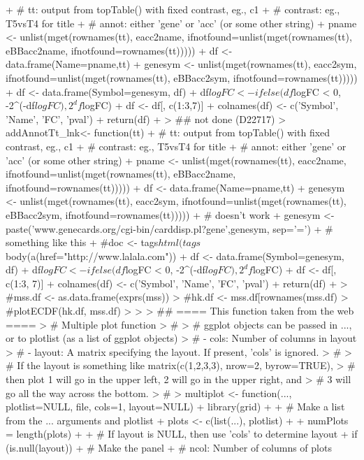 \documentclass[a4paper]{article}
\begin{document}
\begin{Schunk}
\begin{Sinput}
{+     # tt: output from topTable() with fixed contrast, eg., c1
+     # contrast: eg., T5vsT4 for title
+     # annot: either 'gene' or 'acc' (or some other string)
+     pname <- unlist(mget(rownames(tt), eacc2name, ifnotfound=unlist(mget(rownames(tt), eBBacc2name, ifnotfound=rownames(tt)))))
+     df <- data.frame(Name=pname,tt)
+     genesym <- unlist(mget(rownames(tt), eacc2sym, ifnotfound=unlist(mget(rownames(tt), eBBacc2sym, ifnotfound=rownames(tt)))))
+     df <- data.frame(Symbol=genesym, df)
+     df$logFC <- ifelse(df$logFC < 0, -2^(-df$logFC), 2^df$logFC)
+     df <- df[, c(1:3,7)]
+     colnames(df) <- c('Symbol', 'Name', 'FC', 'pval')
+     return(df)
+ }
> ## not done (D22717)
> addAnnotTt_lnk<- function(tt) {
+     # tt: output from topTable() with fixed contrast, eg., c1
+     # contrast: eg., T5vsT4 for title
+     # annot: either 'gene' or 'acc' (or some other string)
+     pname <- unlist(mget(rownames(tt), eacc2name, ifnotfound=unlist(mget(rownames(tt), eBBacc2name, ifnotfound=rownames(tt)))))
+     df <- data.frame(Name=pname,tt)
+     genesym <- unlist(mget(rownames(tt), eacc2sym, ifnotfound=unlist(mget(rownames(tt), eBBacc2sym, ifnotfound=rownames(tt)))))
+     # doesn't work
+     genesym <- paste('www.genecards.org/cgi-bin/carddisp.pl?gene',genesym, sep='=')
+     # something like this
+     #doc <- tags$html(tags$body(a(href="http://www.lalala.com"))
+     df <- data.frame(Symbol=genesym, df)
+     df$logFC <- ifelse(df$logFC < 0, -2^(-df$logFC), 2^df$logFC)
+     df <- df[, c(1:3, 7)]
+     colnames(df) <- c('Symbol', 'Name', 'FC', 'pval')
+     return(df)
+ }
> #mss.df <- as.data.frame(exprs(mss))
> #hk.df <- mss.df[rownames(mss.df) %in% hk,]
> #plotECDF(hk.df, mss.df)
> 
> 
> ## ==== This function taken from the web ====
> # Multiple plot function
> #
> # ggplot objects can be passed in ..., or to plotlist (as a list of ggplot objects)
> # - cols:   Number of columns in layout
> # - layout: A matrix specifying the layout. If present, 'cols' is ignored.
> #
> # If the layout is something like matrix(c(1,2,3,3), nrow=2, byrow=TRUE),
> # then plot 1 will go in the upper left, 2 will go in the upper right, and
> # 3 will go all the way across the bottom.
> #
> multiplot <- function(..., plotlist=NULL, file, cols=1, layout=NULL) {
+     library(grid)
+ 
+     # Make a list from the ... arguments and plotlist
+     plots <- c(list(...), plotlist)
+ 
+     numPlots = length(plots)
+ 
+     # If layout is NULL, then use 'cols' to determine layout
+     if (is.null(layout)) {
+         # Make the panel
+         # ncol: Number of columns of plots
}}
\end{Sinput}
\end{Schunk}
\end{document}
